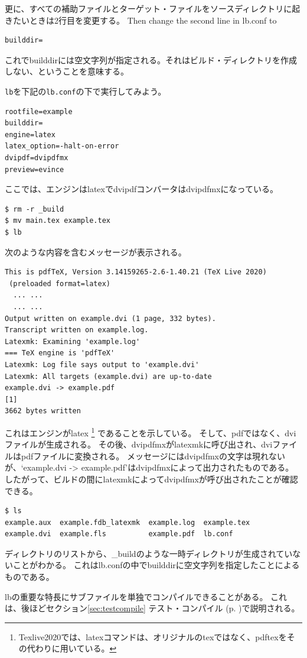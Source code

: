 更に、すべての補助ファイルとターゲット・ファイルをソースディレクトリに起きたいときは2行目を変更する。
Then change the second line in lb.conf to
\begin{verbatim}
builddir=
\end{verbatim}
これでbuilddirには空文字列が指定される。それはビルド・ディレクトリを作成しない、ということを意味する。

\verb|lb|を下記の\verb|lb.conf|の下で実行してみよう。
\begin{verbatim}
rootfile=example
builddir=
engine=latex
latex_option=-halt-on-error
dvipdf=dvipdfmx
preview=evince
\end{verbatim}
ここでは、エンジンはlatexでdvipdfコンバータはdvipdfmxになっている。
\begin{verbatim}
$ rm -r _build
$ mv main.tex example.tex
$ lb
\end{verbatim}
次のような内容を含むメッセージが表示される。
\begin{verbatim}
This is pdfTeX, Version 3.14159265-2.6-1.40.21 (TeX Live 2020)
 (preloaded format=latex)
  ... ...
  ... ...
Output written on example.dvi (1 page, 332 bytes).
Transcript written on example.log.
Latexmk: Examining 'example.log'
=== TeX engine is 'pdfTeX'
Latexmk: Log file says output to 'example.dvi'
Latexmk: All targets (example.dvi) are up-to-date
example.dvi -> example.pdf
[1]
3662 bytes written
\end{verbatim}
これはエンジンがlatex%
\footnote{
Texlive2020では、latexコマンドは、オリジナルのtexではなく、pdftexをその代わりに用いている。
}
であることを示している。
そして、pdfではなく、dviファイルが生成される。
その後、dvipdfmxがlatexmkに呼び出され、dviファイルはpdfファイルに変換される。
メッセージにはdvipdfmxの文字は現れないが、`example.dvi -{\textgreater} example.pdf'はdvipdfmxによって出力されたものである。
したがって、ビルドの間にlatexmkによってdvipdfmxが呼び出されたことが確認できる。
\begin{verbatim}
$ ls
example.aux  example.fdb_latexmk  example.log  example.tex
example.dvi  example.fls          example.pdf  lb.conf
\end{verbatim}
ディレクトリのリストから、\_buildのような一時ディレクトリが生成されていないことがわかる。
これはlb.confの中でbuilddirに空文字列を指定したことによるものである。

lbの重要な特長にサブファイルを単独でコンパイルできることがある。
これは、後ほどセクション\ref{sec:testcompile} テスト・コンパイル (p. \pageref{sec:testcompile})で説明される。
